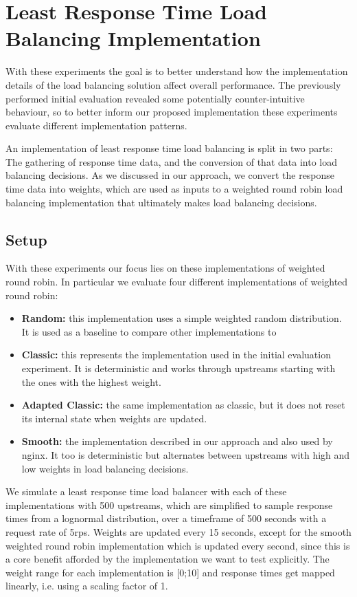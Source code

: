 \section{Least Response Time Load Balancing Implementation}
With these experiments the goal is to better understand how the implementation details of the load balancing solution affect overall performance.
The previously performed initial evaluation revealed some potentially counter-intuitive behaviour, so to better inform our proposed implementation these experiments evaluate different implementation patterns.

An implementation of least response time load balancing is split in two parts: The gathering of response time data, and the conversion of that data into load balancing decisions.
As we discussed in our approach, we convert the response time data into weights, which are used as inputs to a weighted round robin load balancing implementation that ultimately makes load balancing decisions.
\subsection{Setup}
With these experiments our focus lies on these implementations of weighted round robin.
In particular we evaluate four different implementations of weighted round robin:
\begin{itemize}
    \item \textbf{Random:} this implementation uses a simple weighted random distribution. It is used as a baseline to compare other implementations to
    \item \textbf{Classic:} this represents the implementation used in the initial evaluation experiment\cite{wrr-kblinux}. It is deterministic and works through upstreams starting with the ones with the highest weight.
    \item \textbf{Adapted Classic:} the same implementation as classic, but it does not reset its internal state when weights are updated. 
    \item \textbf{Smooth:} the implementation described in our approach and also used by nginx\cite{nginx-wrr}. It too is deterministic but alternates between upstreams with high and low weights in load balancing decisions.
\end{itemize}

We simulate a least response time load balancer with each of these implementations with 500 upstreams, which are simplified to sample response times from a lognormal distribution, over a timeframe of 500 seconds with a request rate of 5\gls{rps}.
Weights are updated every 15 seconds, except for the smooth weighted round robin implementation which is updated every second, since this is a core benefit afforded by the implementation we want to test explicitly.
The weight range for each implementation is [0;10] and response times get mapped linearly, i.e. using a scaling factor of 1.

